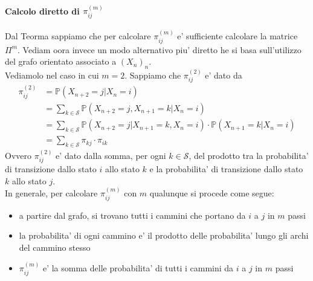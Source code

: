 \documentclass[a4paper,12pt]{article}
\begin{document}
\paragraph{Calcolo diretto di $\pi_{ij}^{(m)}$} Dal Teorma sappiamo che per calcolare $\pi_{ij}^{(m)}$ e' sufficiente calcolare la matrice $\Pi^m$. Vediam oora invece un modo alternativo piu' diretto he
si basa sull’utilizzo del grafo orientato associato a $(X_n)_n$.\\ 
Vediamolo nel caso in cui $m=2$. Sappiamo che $\pi_{ij}^{(2)}$ e' dato da
\begin{align*}
  \pi_{ij}^{(2)} & = \mathbb{P}(X_{n+2} = j | X_n = i) \\
  & = \sum_{k \in \mathcal{S}} \mathbb{P}(X_{n+2} = j, X_{n+1} = k | X_n = i) \\
  & = \sum_{k \in \mathcal{S}} \mathbb{P}(X_{n+2} = j | X_{n+1} = k, X_n = i) \cdot \mathbb{P}(X_{n+1} = k | X_n = i) \\
  & = \sum_{k \in \mathcal{S}} \pi_{kj} \cdot \pi_{ik}
\end{align*}
Ovvero $\pi_{ij}^{(2)}$ e' dato dalla somma, per ogni $k \in \mathcal{S}$, del prodotto tra la probabilita' di transizione dallo stato $i$ allo stato $k$ e la probabilita' di transizione dallo stato $k$ allo stato $j$.\\
In generale, per calcolare $\pi_{ij}^{(m)}$ con $m$ qualunque si procede come segue:
\begin{itemize}
  \item a partire dal grafo, si trovano tutti i cammini che portano da $i$ a $j$ in $m$ passi
  \item la probabilita' di ogni cammino e' il prodotto delle probabilita' lungo gli archi del cammino stesso
  \item $\pi_{ij}^{(m)}$ e' la somma delle probabilita' di tutti i cammini da $i$ a $j$ in $m$ passi
\end{itemize}
\end{document}
